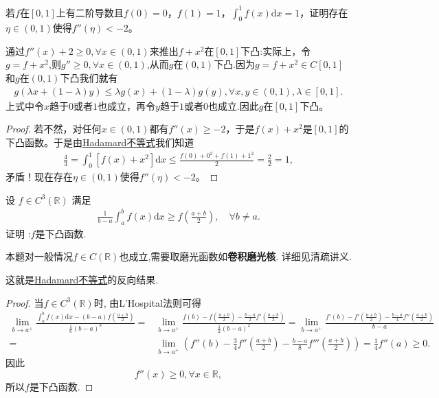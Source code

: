 \documentclass[../../main.tex]{subfiles}%
\begin{document}
\begin{example}
若$f$在$[0,1]$上有二阶导数且$f(0) = 0$，$f(1) = 1$，$\int_0^1 f(x)\mathrm{d}x = 1$，证明存在$\eta\in(0,1)$使得$f''(\eta)< -2$。
\end{example}
\begin{remark}
通过$f''(x)+2\geqslant  0,\forall x\in(0,1)$来推出$f + x^2$在$[0,1]$下凸:实际上，令$g=f+x^2$,则$g''\geqslant  0,\forall x\in(0,1)$,从而$g$在$(0,1)$下凸.因为$g = f + x^2\in C[0,1]$和$g$在$(0,1)$下凸我们就有
\begin{align*}
g(\lambda x + (1 - \lambda)y)\leqslant \lambda g(x) + (1 - \lambda)g(y),\forall x,y\in(0,1),\lambda\in[0,1].
\end{align*}
上式中令$x$趋于$0$或者$1$也成立，再令$y$趋于$1$或者$0$也成立.因此$g$在$[0,1]$下凸。 
\end{remark}
\begin{proof}
若不然，对任何$x\in(0,1)$都有$f''(x)\geqslant  -2$，于是$f(x) + x^2$是$[0,1]$的下凸函数。于是由\hyperref[theorem:Hadamard不等式]{Hadamard不等式}我们知道
\begin{align*}
\frac{4}{3}=\int_0^1 [f(x) + x^2]\mathrm{d}x\leqslant \frac{f(0) + 0^2 + f(1) + 1^2}{2}=\frac{2}{2}=1,
\end{align*}
矛盾！现在存在$\eta\in(0,1)$使得$f''(\eta)< -2$。
\end{proof}

\begin{proposition}
设 \(f\in C^3(\mathbb{R})\) 满足
\begin{align*}
\frac{1}{b - a}\int_{a}^{b}f(x)\mathrm{d}x \geqslant f\left(\frac{a + b}{2}\right),\quad \forall b\neq a.
\end{align*}
证明 :\(f\)是下凸函数. 
\end{proposition}
\begin{remark}
本题对一般情况$f\in C(\mathbb{R})$也成立,需要取磨光函数如\textbf{卷积磨光核}. 详细见清疏讲义.
\end{remark}
\begin{note}
这就是\hyperref[theorem:Hadamard不等式]{Hadamard不等式}的反向结果.
\end{note}
\begin{proof}
当\(f\in C^{3}(\mathbb{R})\)时, 由L'Hospital法则可得
\begin{align*}
\lim_{b\rightarrow a^+} \frac{\int_a^b{f(x)\mathrm{d}x}-(b-a)f(\frac{a+b}{2})}{\frac{1}{6}(b-a)^3}=&\lim_{b\rightarrow a^+} \frac{f(b)-f(\frac{a+b}{2})-\frac{b-a}{2}f\prime (\frac{a+b}{2})}{\frac{1}{2}(b-a)^2}=\lim_{b\rightarrow a^+} \frac{f\prime (b)-f\prime (\frac{a+b}{2})-\frac{b-a}{4}f'' (\frac{a+b}{2})}{b-a}\\
=&\lim_{b\rightarrow a^+} \left( f'' (b)-\frac{3}{4}f'' \left( \frac{a+b}{2} \right) -\frac{b-a}{8}f''' \left( \frac{a+b}{2} \right) \right) =\frac{1}{4}f'' (a)\geqslant 0.
\end{align*}
因此
\[f''(x)\geqslant 0,\forall x\in \mathbb{R},\]
所以\(f\)是下凸函数.
\end{proof}
\end{document}
